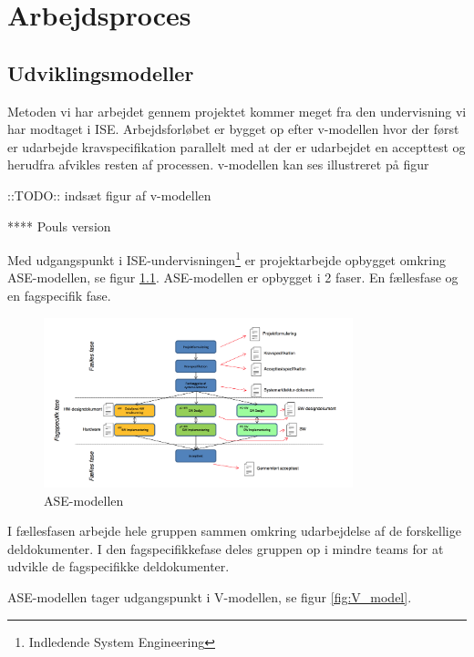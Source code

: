\chapter{Arbejdsproces}

\section{Udviklingsmodeller}

Metoden vi har arbejdet gennem projektet kommer meget fra den undervisning vi har modtaget i ISE. %
Arbejdsforløbet er bygget op efter v-modellen hvor der først er udarbejde kravspecifikation parallelt med at der er udarbejdet en accepttest og herudfra afvikles resten af processen. v-modellen kan ses illustreret på figur %


\begin{large}
::TODO:: indsæt figur af v-modellen
\end{large}



**** Pouls version

Med udgangspunkt i ISE-undervisningen\footnote{Indledende System Engineering} er projektarbejde opbygget omkring ASE-modellen, se figur \ref{fig:ASE_model}. ASE-modellen er opbygget i 2 faser. En fællesfase og en fagspecifik fase. 


\begin{figure}[htbp]
  \centering
    \includegraphics[width=0.8\textwidth]{billeder/ASE-modellen}
    \caption{ASE-modellen}
    \label{fig:ASE_model}
\end{figure}

I fællesfasen arbejde hele gruppen sammen omkring udarbejdelse af de forskellige deldokumenter. 
I den fagspecifikkefase deles gruppen op i mindre teams for at udvikle de fagspecifikke deldokumenter. 

ASE-modellen tager udgangspunkt i V-modellen, se figur \ref{fig:V_model}.   

